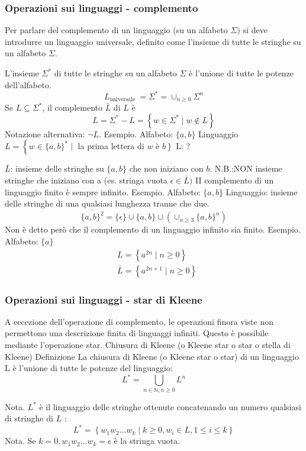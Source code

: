 \subsubsection{Operazioni sui linguaggi - complemento}
Per parlare del complemento di un linguaggio (su un alfabeto $\Sigma)$ si deve introdurre un linguaggio universale, definito come l'insieme di tutte le stringhe su un alfabeto $\Sigma$.

L'insieme $\Sigma^{*}$ di tutte le stringhe su un alfabeto $\Sigma$ è l'unione di tutte le potenze dell'alfabeto.
$$
L_{\text {universale }}=\Sigma^{*}=\cup_{n \geq 0} \Sigma^{n}
$$
Se $L \subseteq \Sigma^{*}$, il complemento $\bar{L}$ di $L$ è
$$
L=\Sigma^{*}-L=\left\{w \in \Sigma^{*} \mid w \notin L\right\}
$$
Notazione alternativa: $\neg L$.
Esempio. Alfabeto: $\{a, b\}$
Linguaggio $L=\left\{w \in\{a, b\}^{*} \mid\right.$ la prima lettera di $w$ è $\left.b\right\}$ L: ?

$\bar{L}$: insieme delle stringhe su $\{a, b\}$ che non iniziano con $b$. N.B.:NON insieme stringhe che iniziano con a (es. stringa vuota $\epsilon \in \bar{L})$
II complemento di un linguaggio finito è sempre infinito.
Esempio. Alfabeto: $\{a, b\}$
Linguaggio: insieme delle stringhe di una qualsiasi lunghezza tranne che due.
$$
\bar{\{a, b\}^{2}}=\{\epsilon\} \cup\{a, b\} \cup\left(\cup_{n \geq 3}\{a, b\}^{n}\right)
$$
Non è detto però che il complemento di un linguaggio infinito sia finito.
Esempio. Alfabeto: $\{a\}$
$$
\begin{aligned}
&L=\left\{a^{2 n} \mid n \geq 0\right\} \\
&\bar{L}=\left\{a^{2 n+1} \mid n \geq 0\right\}
\end{aligned}
$$
\subsubsection{Operazioni sui linguaggi - star di Kleene}
A eccezione dell'operazione di complemento, le operazioni finora viste non permettono una descrizione finita di linguaggi infiniti. Questo è possibile mediante l'operazione star.
Chiusura di Kleene (o Kleene star o star o stella di Kleene)
Definizione
La chiusura di Kleene (o Kleene star o star) di un linguaggio L è l'unione di tutte le potenze del linguaggio:
$$
L^{*}=\bigcup_{n \in \mathbb{N}, n \geq 0} L^{n}
$$

Nota. $L^{*}$ è il linguaggio delle stringhe ottenute concatenando un numero qualsiasi di stringhe di $L$ :
$$
L^{*}=\left\{w_{1} w_{2} \ldots w_{k} \mid k \geq 0, w_{i} \in L, 1 \leq i \leq k\right\}
$$
Nota. Se $k=0, w_{1} w_{2} \ldots w_{k}=\epsilon$ è la stringa vuota.

